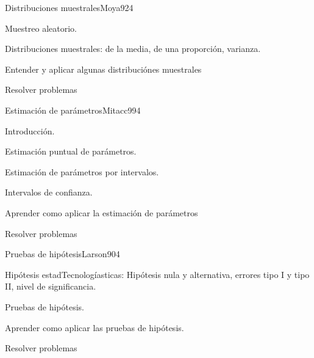 \begin{syllabus}
\begin{unit}{Distribuciones muestrales}{Moya92}{4}
   \begin{topics}
         \item  Muestreo aleatorio.
	 \item  Distribuciones muestrales: de la media, de una proporción, varianza.
   \end{topics}

   \begin{unitgoals}
         \item  Entender y aplicar algunas distribuciónes muestrales
         \item  Resolver problemas
   \end{unitgoals}
\end{unit}

\begin{unit}{Estimación de parámetros}{Mitacc99}{4}
   \begin{topics}
         \item  Introducción.
	 \item  Estimación puntual de parámetros.
	\item Estimación de parámetros por intervalos.
	\item Intervalos de confianza.
   \end{topics}

   \begin{unitgoals}
         \item  Aprender como aplicar la estimación de parámetros
         \item  Resolver problemas
   \end{unitgoals}
\end{unit}

\begin{unit}{Pruebas de hipótesis}{Larson90}{4}
   \begin{topics}
         \item  Hipótesis estadTecnologíasticas: Hipótesis nula y alternativa, errores tipo I y tipo II, nivel de significancia.
	 \item  Pruebas de hipótesis.
   \end{topics}

   \begin{unitgoals}
         \item  Aprender como aplicar las pruebas de hipótesis.
         \item  Resolver problemas
   \end{unitgoals}
\end{unit}

\begin{coursebibliography}
\end{coursebibliography}

\end{syllabus}
